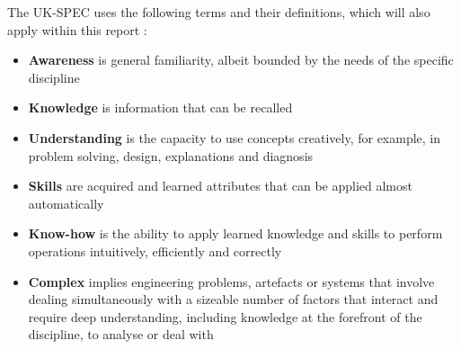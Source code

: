 The UK-SPEC uses the following terms and their definitions, which will also apply within this report \citep{EngineeringCouncil2014}:
\begin{itemize}
    \item \textbf{Awareness} is general familiarity, albeit bounded by the needs of the specific discipline

    \item \textbf{Knowledge} is information that can be recalled

    \item \textbf{Understanding} is the capacity to use concepts creatively, for example, in problem solving, design, explanations and diagnosis

    \item \textbf{Skills} are acquired and learned attributes that can be applied almost automatically

    \item \textbf{Know-how} is the ability to apply learned knowledge and skills to perform operations intuitively, efficiently and correctly

    \item \textbf{Complex} implies engineering problems, artefacts or systems that involve dealing simultaneously with a sizeable number of factors that interact and require deep understanding, including knowledge at the forefront of the discipline, to analyse or deal with

\end{itemize}





